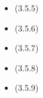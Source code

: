 \documentclass{article}
\begin{document}
\begin{enumerate}
\begin{itemize}
		      \item (3.5.5)

		      \item (3.5.6)
		      \item (3.5.7)
		      \item (3.5.8)
		      \item (3.5.9)
	      \end{itemize}
\end{enumerate}
\end{document}
